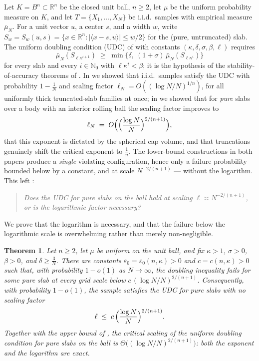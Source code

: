 \documentclass[11pt]{article}
\newtheorem{theorem}{Theorem}[section]
\newcommand{\R}{\mathbb{R}}
\newcommand{\emp}{\bar\mu_N}
\begin{document}
Let $K=B^n\subset\R^n$ be the closed unit ball, $n\ge2$, let
$\mu$ be the uniform probability measure on $K$, and let
$T=\{X_1,\dots,X_N\}$ be i.i.d.\ samples with empirical measure $\emp$.  For a
unit vector $u$, a center $s$, and a width $w$, write
$S_w=S_w(u,s)=\{x\in\R^n:|\langle x-s,u\rangle|\le w/2\}$ for the (pure,
untruncated) slab.  The uniform doubling condition (UDC) of
\cite{ShmaloUDC} with constants $(\kappa,\delta,\sigma,\beta,\ell)$ requires
\[
\emp(S_{\ell\kappa^{i+1}})\;\ge\;
\min\bigl\{\delta,\ (1+\sigma)\,\emp(S_{\ell\kappa^{i}})\bigr\}
\]
for every slab and every $i\in\mathbb N_0$ with $\ell\kappa^i<\beta$; it is the
hypothesis of the stability-of-accuracy theorems of \cite{BJS,ShmaloUDC}.  In
\cite{companion2} we showed that i.i.d.\ samples satisfy the UDC with
probability $1-\frac1N$ and scaling factor
$\ell_N=O((\log N/N)^{1/n})$, for all uniformly thick truncated-slab families
at once; in \cite{companion3} we showed that for \emph{pure} slabs over a body
with an interior rolling ball the scaling factor improves to
\[
\ell_N\;=\;O\Bigl(\Bigl(\frac{\log N}{N}\Bigr)^{2/(n+1)}\Bigr),
\]
that this exponent is dictated by the spherical cap volume, and that
truncations genuinely shift the critical exponent to $\frac1n$.  The
lower-bound constructions in both papers produce a \emph{single} violating
configuration, hence only a failure probability bounded below by a constant,
and at scale $N^{-2/(n+1)}$ --- without the logarithm.  This left
\cite[Problem 5.1]{companion3}:

\begin{quote}
\emph{Does the UDC for pure slabs on the ball hold at scaling
$\ell\asymp N^{-2/(n+1)}$, or is the logarithmic factor necessary?}
\end{quote}

We prove that the logarithm is necessary, and that the failure below the
logarithmic scale is overwhelming rather than merely non-negligible.

\begin{theorem}\label{thm:main}
Let $n\ge2$, let $\mu$ be uniform on the unit ball, and fix
$\kappa>1$, $\sigma>0$, $\beta>0$, and $\delta\ge\frac3N$.  There are
constants $\varepsilon_0=\varepsilon_0(n,\kappa)>0$ and
$c=c(n,\kappa)>0$ such that, with probability $1-o(1)$ as
$N\to\infty$, the doubling inequality fails for some pure slab at every grid
scale below $c\,(\log N/N)^{2/(n+1)}$.  Consequently, with probability
$1-o(1)$, the sample satisfies the UDC for pure slabs with \emph{no} scaling
factor
\[
\ell\;\le\;c\,\Bigl(\frac{\log N}{N}\Bigr)^{2/(n+1)} .
\]
Together with the upper bound of \cite{companion3}, the critical scaling of
the uniform doubling condition for pure slabs on the ball is
$\Theta\bigl((\log N/N)^{2/(n+1)}\bigr)$: both the exponent and the logarithm
are exact.
\end{theorem}
\end{document}
